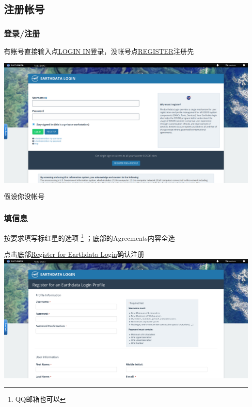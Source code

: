 \subsection{注册帐号}
\begin{frame}
    \frametitle{登录/注册}
    有账号直接输入点\uline{LOGIN IN}登录，没帐号点\uline{REGISTER}注册先

    \includegraphics[width=\linewidth]{images/4.登陆界面.png}

    假设你没帐号
\end{frame}
\begin{frame}
    \frametitle{填信息}
    按要求填写标红星的选项
    \footnote{QQ邮箱也可以}
    ；底部的Agreements内容全选

    点击底部\uline{Register for Earthdata Login}确认注册
\includegraphics[width=\linewidth]{images/5.注册帐号.png}
\end{frame}
